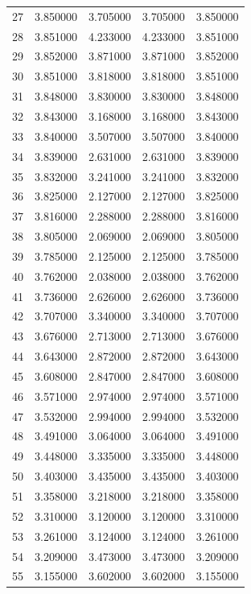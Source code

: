 \begin{tabular}{lrrrr}
27 & 3.850000 & 3.705000 & 3.705000 & 3.850000 \\
28 & 3.851000 & 4.233000 & 4.233000 & 3.851000 \\
29 & 3.852000 & 3.871000 & 3.871000 & 3.852000 \\
30 & 3.851000 & 3.818000 & 3.818000 & 3.851000 \\
31 & 3.848000 & 3.830000 & 3.830000 & 3.848000 \\
32 & 3.843000 & 3.168000 & 3.168000 & 3.843000 \\
33 & 3.840000 & 3.507000 & 3.507000 & 3.840000 \\
34 & 3.839000 & 2.631000 & 2.631000 & 3.839000 \\
35 & 3.832000 & 3.241000 & 3.241000 & 3.832000 \\
36 & 3.825000 & 2.127000 & 2.127000 & 3.825000 \\
37 & 3.816000 & 2.288000 & 2.288000 & 3.816000 \\
38 & 3.805000 & 2.069000 & 2.069000 & 3.805000 \\
39 & 3.785000 & 2.125000 & 2.125000 & 3.785000 \\
40 & 3.762000 & 2.038000 & 2.038000 & 3.762000 \\
41 & 3.736000 & 2.626000 & 2.626000 & 3.736000 \\
42 & 3.707000 & 3.340000 & 3.340000 & 3.707000 \\
43 & 3.676000 & 2.713000 & 2.713000 & 3.676000 \\
44 & 3.643000 & 2.872000 & 2.872000 & 3.643000 \\
45 & 3.608000 & 2.847000 & 2.847000 & 3.608000 \\
46 & 3.571000 & 2.974000 & 2.974000 & 3.571000 \\
47 & 3.532000 & 2.994000 & 2.994000 & 3.532000 \\
48 & 3.491000 & 3.064000 & 3.064000 & 3.491000 \\
49 & 3.448000 & 3.335000 & 3.335000 & 3.448000 \\
50 & 3.403000 & 3.435000 & 3.435000 & 3.403000 \\
51 & 3.358000 & 3.218000 & 3.218000 & 3.358000 \\
52 & 3.310000 & 3.120000 & 3.120000 & 3.310000 \\
53 & 3.261000 & 3.124000 & 3.124000 & 3.261000 \\
54 & 3.209000 & 3.473000 & 3.473000 & 3.209000 \\
55 & 3.155000 & 3.602000 & 3.602000 & 3.155000 \\

\end{tabular}
